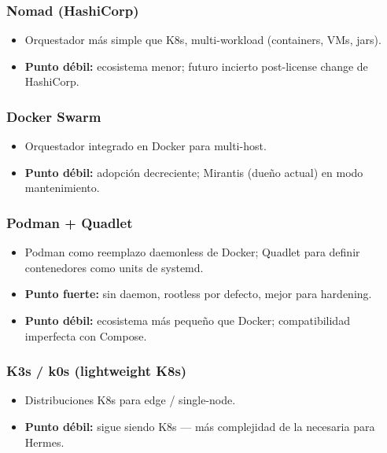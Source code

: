 \documentclass[11pt,a4paper]{article}
\begin{document}
\subsubsection{Nomad (HashiCorp)}
\begin{itemize}[leftmargin=*,itemsep=0pt]
\item Orquestador más simple que K8s, multi-workload (containers, VMs, jars).
\item \textbf{Punto débil:} ecosistema menor; futuro incierto post-license change de HashiCorp.
\end{itemize}

\subsubsection{Docker Swarm}
\begin{itemize}[leftmargin=*,itemsep=0pt]
\item Orquestador integrado en Docker para multi-host.
\item \textbf{Punto débil:} adopción decreciente; Mirantis (dueño actual) en modo mantenimiento.
\end{itemize}

\subsubsection{Podman + Quadlet}
\begin{itemize}[leftmargin=*,itemsep=0pt]
\item Podman como reemplazo daemonless de Docker; Quadlet para definir contenedores como units de systemd.
\item \textbf{Punto fuerte:} sin daemon, rootless por defecto, mejor para hardening.
\item \textbf{Punto débil:} ecosistema más pequeño que Docker; compatibilidad imperfecta con Compose.
\end{itemize}

\subsubsection{K3s / k0s (lightweight K8s)}
\begin{itemize}[leftmargin=*,itemsep=0pt]
\item Distribuciones K8s para edge / single-node.
\item \textbf{Punto débil:} sigue siendo K8s — más complejidad de la necesaria para Hermes.
\end{itemize}
\end{document}
